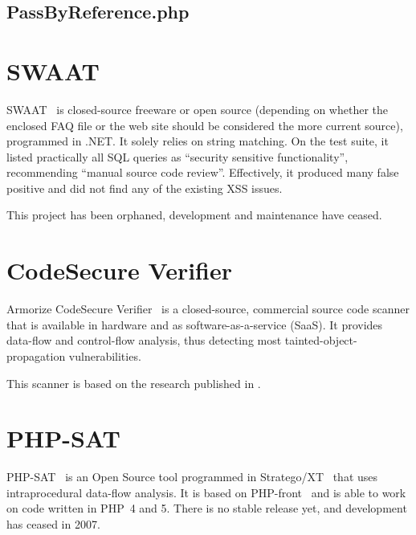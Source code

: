 \subsection{PassByReference.php}
\small
{}
\normalsize



\section{SWAAT}
\label{swaat}
SWAAT~\cite{swaat} is closed-source freeware or open source (depending on whether the enclosed FAQ file or the web site should be considered the more current source), programmed in .NET. It solely relies on string matching. On the test suite, it listed practically all SQL queries as ``security sensitive functionality'', recommending ``manual source code review''. Effectively, it produced many false positive and did not find any of the existing XSS issues.

This project has been orphaned, \ie development and maintenance have ceased.

\section{CodeSecure Verifier}
\label{armorize}
Armorize CodeSecure Verifier~\cite{codesecure, verifier} is a closed-source, commercial source code scanner that is available in hardware and as software-as-a-service (SaaS). It provides data-flow and control-flow analysis, thus detecting most tainted-object-propagation vulnerabilities.

This scanner is based on the research published in \cite{huang-securing}.

\section{PHP-SAT}
\label{php-sat}
PHP-SAT~\cite{php-sat} is an Open Source tool programmed in Stratego/XT~\cite{stratego} that uses intraprocedural data-flow analysis. It is based on PHP-front~\cite{php-front} and is able to work on code written in PHP~4 and 5. There is no stable release yet, and development has ceased in 2007.

